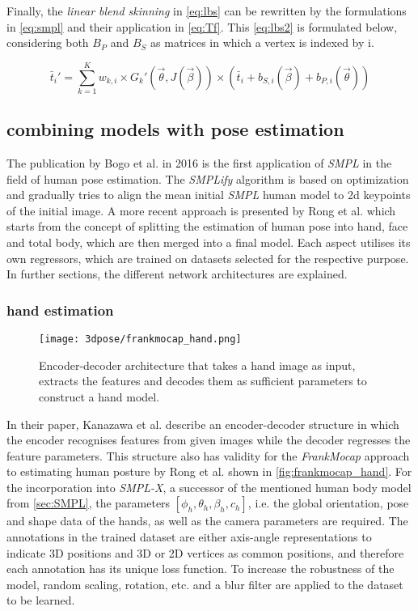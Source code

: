 Finally, the \emph{linear blend skinning} in \autoref{eq:lbs} can be rewritten by the formulations in \autoref{eq:smpl} and their application in \autoref{eq:Tf}. This \autoref{eq:lbs2} is formulated below, considering both $B_{P}$ and $B_{S}$ as matrices in which a vertex is indexed by i. \cite{smpl}

\begin{equation}
\label{eq:lbs2}
\bar{t}_{i}' = \sum_{k=1}^{K} w_{k,i} \times G_{k}'(\vec{\theta},J(\vec{\beta})) \times (\bar{t}_{i} + b_{S,i}(\vec{\beta}) +b_{P,i}(\vec{\theta}))
\end{equation}

\subsection{combining models with pose estimation}
The publication by Bogo et al. \cite{simplify} in 2016 is the first application of \emph{SMPL} in the field of human pose estimation. The \emph{SMPLify} algorithm is based on optimization and gradually tries to align the mean initial \emph{SMPL} human model to 2d keypoints of the initial image. A more recent approach is presented by Rong et al. \cite{frankmocap} which starts from the concept of splitting the estimation of human pose into hand, face and total body, which are then merged into a final model. Each aspect utilises its own regressors, which are trained on datasets selected for the respective purpose. In further sections, the different network architectures are explained.

\subsubsection{hand estimation}
\begin{figure}[h]
	\centering
	\texttt{[image: 3dpose/frankmocap\_hand.png]}
	\caption{Encoder-decoder architecture that takes a hand image as input, extracts the features and decodes them as sufficient parameters to construct a hand model.\cite{frankmocap}}
	\label{fig:frankmocap_hand}
\end{figure}

In their paper, Kanazawa et al. \cite{hmr} describe an encoder-decoder structure in which the encoder recognises features from given images while the decoder regresses the feature parameters. This structure also has validity for the \emph{FrankMocap} approach to estimating human posture by Rong et al. shown in \autoref{fig:frankmocap_hand}. For the incorporation into \emph{SMPL-X}, a successor of the mentioned human body model from \autoref{sec:SMPL}, the parameters $[\phi_{h},\theta_{h},\beta_{h},c_{h}]$, i.e. the global orientation, pose and shape data of the hands, as well as the camera parameters are required. The annotations in the trained dataset are either axis-angle representations to indicate 3D positions and 3D or 2D vertices as common positions, and therefore each annotation has its unique loss function. To increase the robustness of the model, random scaling, rotation, etc. and a blur filter are applied to the dataset to be learned.

